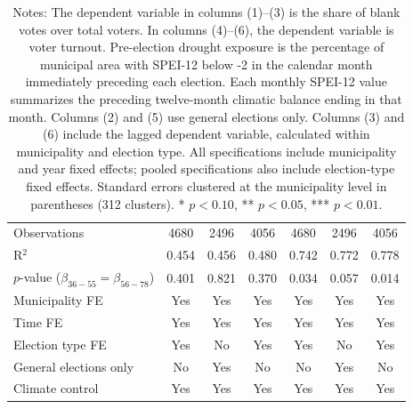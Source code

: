 \begin{table}[!h]
\begin{tabular}[t]{lcccccc}
\addlinespace
Observations & 4680 & 2496 & 4056 & 4680 & 2496 & 4056\\
R$^2$ & 0.454 & 0.456 & 0.480 & 0.742 & 0.772 & 0.778\\
$p$-value ($\beta_{36{-}55} = \beta_{56{-}78}$) & 0.401 & 0.821 & 0.370 & 0.034 & 0.057 & 0.014\\
Municipality FE & Yes & Yes & Yes & Yes & Yes & Yes\\
Time FE & Yes & Yes & Yes & Yes & Yes & Yes\\
Election type FE & Yes & No & Yes & Yes & No & Yes\\
General elections only & No & Yes & No & No & Yes & No\\
Climate control & Yes & Yes & Yes & Yes & Yes & Yes\\
\hline
\end{tabular}
\vspace{0.3em}
\captionsetup{justification=justified, singlelinecheck=false}
\caption*{\footnotesize Notes: The dependent variable in columns (1)--(3) is the share of blank votes over total voters. In columns (4)--(6), the dependent variable is voter turnout. Pre-election drought exposure is the percentage of municipal area with SPEI-12 below -2 in the calendar month immediately preceding each election. Each monthly SPEI-12 value summarizes the preceding twelve-month climatic balance ending in that month. Columns (2) and (5) use general elections only. Columns (3) and (6) include the lagged dependent variable, calculated within municipality and election type. All specifications include municipality and year fixed effects; pooled specifications also include election-type fixed effects. Standard errors clustered at the municipality level in parentheses (312 clusters). * $p<0.10$, ** $p<0.05$, *** $p<0.01$.}
\end{table}
